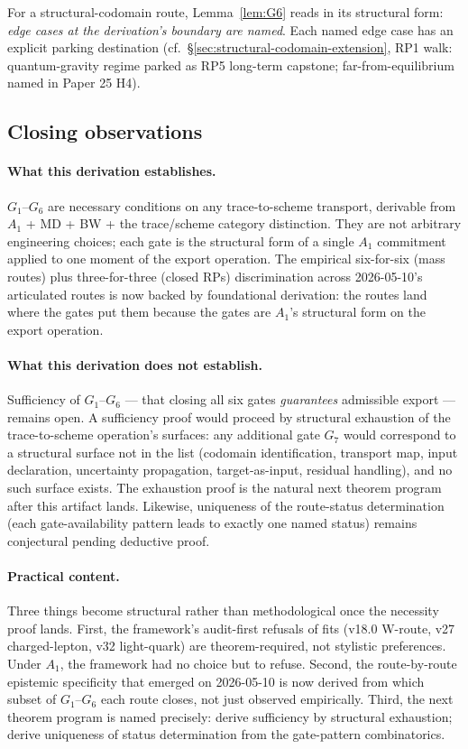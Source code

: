 For a structural-codomain route, Lemma~\ref{lem:G6} reads in its structural form: \emph{edge cases at the derivation's boundary are named}. Each named edge case has an explicit parking destination (cf.\ \S\ref{sec:structural-codomain-extension}, RP1 walk: quantum-gravity regime parked as RP5 long-term capstone; far-from-equilibrium named in Paper 25 H4).

\subsection{Closing observations}
\label{subsec:closing-g1g6}

\paragraph{What this derivation establishes.} $G_1$--$G_6$ are necessary conditions on any trace-to-scheme transport, derivable from $A_1$ + MD + BW + the trace/scheme category distinction. They are not arbitrary engineering choices; each gate is the structural form of a single $A_1$ commitment applied to one moment of the export operation. The empirical six-for-six (mass routes) plus three-for-three (closed RPs) discrimination across 2026-05-10's articulated routes is now backed by foundational derivation: the routes land where the gates put them because the gates are $A_1$'s structural form on the export operation.

\paragraph{What this derivation does not establish.} Sufficiency of $G_1$--$G_6$ --- that closing all six gates \emph{guarantees} admissible export --- remains open. A sufficiency proof would proceed by structural exhaustion of the trace-to-scheme operation's surfaces: any additional gate $G_7$ would correspond to a structural surface not in the list (codomain identification, transport map, input declaration, uncertainty propagation, target-as-input, residual handling), and no such surface exists. The exhaustion proof is the natural next theorem program after this artifact lands. Likewise, uniqueness of the route-status determination (each gate-availability pattern leads to exactly one named status) remains conjectural pending deductive proof.

\paragraph{Practical content.} Three things become structural rather than methodological once the necessity proof lands. First, the framework's audit-first refusals of fits (v18.0 W-route, v27 charged-lepton, v32 light-quark) are theorem-required, not stylistic preferences. Under $A_1$, the framework had no choice but to refuse. Second, the route-by-route epistemic specificity that emerged on 2026-05-10 is now derived from which subset of $G_1$--$G_6$ each route closes, not just observed empirically. Third, the next theorem program is named precisely: derive sufficiency by structural exhaustion; derive uniqueness of status determination from the gate-pattern combinatorics.
